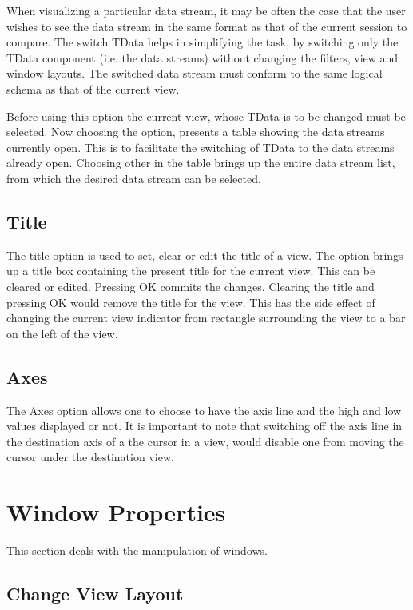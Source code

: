 When visualizing a particular data stream, it may be often the case
that the user wishes to see the data stream in the same format as that
of the current session to compare. The switch TData helps in
simplifying the task, by switching only the TData component (i.e. the
data streams) without changing the filters, view and window
layouts. The switched data stream must conform to the same logical
schema as that of the current view.

Before using this option the current view, whose TData is to be
changed must be selected.  Now choosing the option, presents a table
showing the data streams currently open. This is to facilitate the
switching of TData to the data streams already open. Choosing other in
the table brings up the entire data stream list, from which the
desired data stream can be selected.


\subsection{Title}

The title option is used to set, clear or edit the title of a
view. The option brings up a title box containing the present title
for the current view. This can be cleared or edited. Pressing OK
commits the changes. Clearing the title and pressing OK would remove
the title for the view. This has the side effect of changing the
current view indicator from rectangle surrounding the view to a bar on
the left of the view.

\subsection{Axes}

The Axes option allows one to choose to have the axis line and the
high and low values displayed or not. It is important to note that
switching off the axis line in the destination axis of a the cursor in
a view, would disable one from moving the cursor under the destination
view.

\section{Window Properties}

This section deals with the manipulation of windows.

\subsection{Change View Layout}


